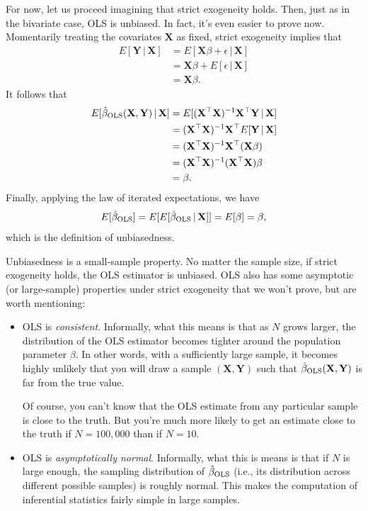 \documentclass[12pt,oneside,openany]{book}
\begin{document}
For now, let us proceed imagining that strict exogeneity holds. Then,
just as in the bivariate case, OLS is unbiased. In fact, it's even
easier to prove now. Momentarily treating the covariates \(\mathbf{X}\)
as fixed, strict exogeneity implies that \[
\begin{aligned}
E[\mathbf{Y} \,|\, \mathbf{X}]
&= E[\mathbf{X} \beta + \epsilon \,|\, \mathbf{X}] \\
&= \mathbf{X} \beta + E[\epsilon \,|\, \mathbf{X}] \\
&= \mathbf{X} \beta.
\end{aligned}
\] It follows that \[
\begin{aligned}
E[\hat{\beta}_{\text{OLS}}(\mathbf{X}, \mathbf{Y}) \,|\, \mathbf{X}]
&= E[(\mathbf{X}^\top \mathbf{X})^{-1} \mathbf{X}^\top \mathbf{Y} \,|\, \mathbf{X}] \\
&= (\mathbf{X}^\top \mathbf{X})^{-1} \mathbf{X}^\top E[\mathbf{Y} \,|\, \mathbf{X}] \\
&= (\mathbf{X}^\top \mathbf{X})^{-1} \mathbf{X}^\top (\mathbf{X} \beta) \\
&= (\mathbf{X}^\top \mathbf{X})^{-1} (\mathbf{X}^\top \mathbf{X}) \beta \\
&= \beta.
\end{aligned}
\] Finally, applying the law of iterated expectations, we have \[
E[\hat{\beta}_{\text{OLS}}] = E [ E[\hat{\beta}_{\text{OLS}} \,|\, \mathbf{X}] ] = E [ \beta ] = \beta,
\] which is the definition of unbiasedness.

Unbiasedness is a small-sample property. No matter the sample size, if
strict exogeneity holds, the OLS estimator is unbiased. OLS also has
some asymptotic (or large-sample) properties under strict exogeneity
that we won't prove, but are worth mentioning:

\begin{itemize}
\item
  OLS is \emph{consistent}. Informally, what this means is that as \(N\)
  grows larger, the distribution of the OLS estimator becomes tighter
  around the population parameter \(\beta\). In other words, with a
  sufficiently large sample, it becomes highly unlikely that you will
  draw a sample \((\mathbf{X}, \mathbf{Y})\) such that
  \(\hat{\beta}_{\text{OLS}}(\mathbf{X}, \mathbf{Y})\) is far from the true
  value.

  Of course, you can't know that the OLS estimate from any particular
  sample is close to the truth. But you're much more likely to get an
  estimate close to the truth if \(N = 100{,}000\) than if \(N = 10\).
\item
  OLS is \emph{asymptotically normal}. Informally, what this is means is
  that if \(N\) is large enough, the sampling distribution of
  \(\hat{\beta}_{\text{OLS}}\) (i.e., its distribution across different
  possible samples) is roughly normal. This makes the computation of
  inferential statistics fairly simple in large samples.
\end{itemize}
\end{document}
